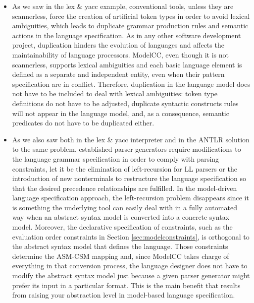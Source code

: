 \documentclass[preprint]{elsarticle}
\begin{document}
\begin{itemize}

\item
As we saw in the lex \& yacc example, conventional tools, unless they are scannerless, force the creation of artificial token types in order to avoid lexical ambiguities, which leads to duplicate grammar production rules and semantic actions in the language specification.
As in any other software development project, duplication hinders the evolution of languages and affects the maintainability of language processors.
ModelCC, even though it is not scannerless, supports lexical ambiguities and each basic language element is defined as a separate and independent entity, even when their pattern specification are in conflict.
Therefore, duplication in the language model does not have to be included to deal with lexical ambiguities: token type definitions do not have to be adjusted, duplicate syntactic constructs rules will not appear in the language model, and, as a consequence, semantic predicates do not have to be duplicated either.


\item
As we also saw both in the lex \& yacc interpreter and in the ANTLR solution to the same problem, established parser generators require modifications to the language grammar specification in order to comply with parsing constraints, let it be the elimination of left-recursion for LL parsers or the introduction of new nonterminals to restructure the language specification so that the desired precedence relationships are fulfilled.
In the model-driven language specification approach, the left-recursion problem disappears since it is something the underlying tool can easily deal with in a fully automated way when an abstract syntax model is converted into a concrete syntax model.
Moreover, the declarative specification of constraints, such as the evaluation order constraints in Section \ref{sec:modelconstraints}, is orthogonal to the abstract syntax model that defines the language.
Those constraints determine the ASM-CSM mapping and, since ModelCC takes charge of everything in that conversion process, the language designer does not have to modify the abstract syntax model just because a given parser generator might prefer its input in a particular format.
This is the main benefit that results from raising your abstraction level in model-based language specification.


\end{itemize}
\end{document}
